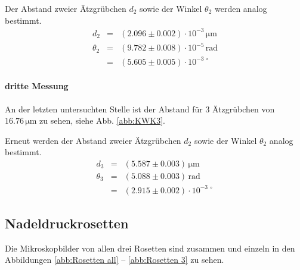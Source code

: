 \documentclass[12pt,a4paper]{scrartcl}
\numberwithin{equation}{section} %
\begin{document}
Der Abstand zweier Ätzgrübchen $d_2$ sowie der Winkel $\theta_2$
werden analog bestimmt.
\begin{eqnarray}
    d_2 & = & (2.096\pm 0.002) \cdot 10^{-3} \mathrm{\, \mu m} \\
    \theta_2 &=& (9.782 \pm 0.008) \cdot 10^{-5} \mathrm{\, rad} \\
        &=& (5.605 \pm 0.005) \cdot 10^{-3\ \circ}
\end{eqnarray}

\hypertarget{dritte-messung}{%
\paragraph*{dritte Messung}\label{dritte-messung}}

An der letzten untersuchten Stelle ist der Abstand für $3$ Ätzgrübchen
von $16.76 \mathrm{\, \mu m}$ zu sehen, siehe Abb. \ref{abb:KWK3}.

Erneut werden der Abstand zweier Ätzgrübchen $d_2$ sowie der Winkel
$\theta_2$ analog bestimmt.
\begin{eqnarray}
    d_3 &=& (5.587 \pm 0.003) \mathrm{\, \mu m} \\
    \theta_3 &=& (5.088 \pm 0.003) \mathrm{\, rad} \\
        &=& (2.915 \pm 0.002) \cdot 10^{-3\ \circ}
\end{eqnarray}

\hypertarget{nadeldruckrosetten-1}{%
\subsection{Nadeldruckrosetten}\label{nadeldruckrosetten-1}}

Die Mikroskopbilder von allen drei Rosetten sind zusammen und einzeln in
den Abbildungen \ref{abb:Rosetten all} -- \ref{abb:Rosetten 3} zu sehen.
\end{document}
